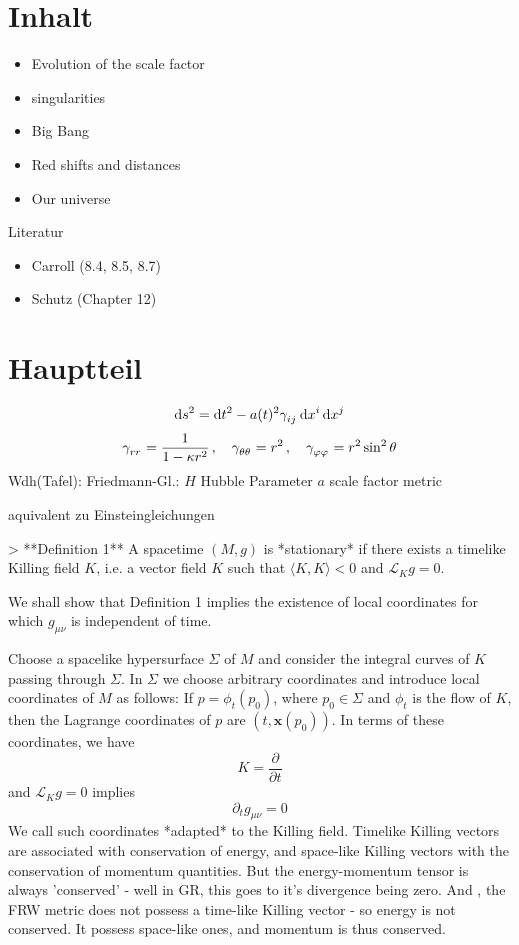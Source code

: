 \documentclass[10pt,oneside,a4paper]{scrartcl}
\renewcommand{\vec}{\mathbf}
\theoremstyle{definition}
\theoremstyle{remark}
\begin{document}
\onehalfspacing
{}
\section{Inhalt}
\begin{itemize}
  \item Evolution of the scale factor
  \item singularities
  \item Big Bang
  \item Red shifts and distances
  \item Our universe
\end{itemize}
Literatur
\begin{itemize}
  \item  Carroll (8.4, 8.5, 8.7)
  \item  Schutz (Chapter 12)
\end{itemize}
\section{Hauptteil}
\begin{equation}
\dif s^2=\dif
t^2-a(t)^2\tensor{\gamma}{_i_j}\dif\tensor{x}{^i}\dif\tensor{x}{^j}
\end{equation}
\begin{equation}
\tensor{\gamma}{_r_r}=\frac{1}{1-\kappa r^2}\,,
\quad\tensor{\gamma}{_\theta_\theta}=r^2\,,
\quad\tensor{\gamma}{_\varphi_\varphi}=r^2\sin^2\theta 
\end{equation}
Wdh(Tafel):
Friedmann-Gl.:
$H$ Hubble Parameter
$a$ scale factor
metric

aquivalent zu Einsteingleichungen

> **Definition 1** A spacetime $(M,g)$ is *stationary* if there exists a timelike Killing field $K$, i.e. a vector field $K$ such that $\langle K,K\rangle<0$ and $\mathcal{L}_Kg=0$. 

We shall show that Definition 1 implies the existence of local coordinates for which $g_{\mu\nu}$ is independent of time. 

Choose a spacelike hypersurface $\Sigma$ of $M$ and consider the integral curves of $K$ passing through $\Sigma$. In $\Sigma$ we choose arbitrary coordinates and introduce local coordinates of $M$ as follows: If $p=\phi_t(p_0)$, where $p_0\in\Sigma$ and $\phi_t$ is the flow of $K$, then the Lagrange coordinates of $p$ are $(t,\vec{x}(p_0))$. In terms of these coordinates, we have $$K=\frac{\partial}{\partial t}$$ and $\mathcal{L}_Kg=0$ implies
$$\partial_tg_{\mu\nu}=0$$
We call such coordinates *adapted* to the Killing field.
Timelike Killing vectors are associated with conservation of energy, and space-like Killing vectors with the conservation of momentum quantities. But the energy-momentum tensor is always 'conserved' - well in GR, this goes to it's divergence being zero. And , the FRW metric does not possess a time-like Killing vector - so energy is not conserved. It possess space-like ones, and momentum is thus conserved.
\end{document}
